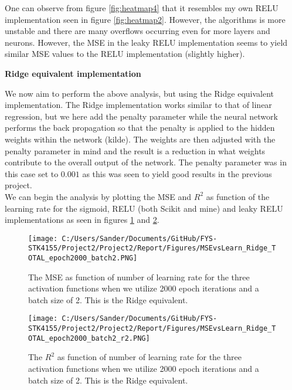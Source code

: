 \documentclass[12pt,a4paper]{article}
\begin{document}
\noindent One can observe from figure \ref{fig:heatmap4} that it resembles my own RELU implementation seen in figure \ref{fig:heatmap2}. However, the algorithms is more unstable and there are many overflows occurring even for more layers and neurons. However, the MSE in the leaky RELU implementation seems to yield similar MSE values to the RELU implementation (slightly higher).

\begin{center}
\large{\textbf{Ridge equivalent implementation}}
\end{center}

\noindent We now aim to perform the above analysis, but using the Ridge equivalent implementation. The Ridge implementation works similar to that of linear regression, but we here add the penalty parameter while the neural network performs the back propagation so that the penalty is applied to the hidden weights within the network (kilde). The weights are then adjusted with the penalty parameter in mind and the result is a reduction in what weights contribute to the overall output of the network. The penalty parameter was in this case set to $0.001$ as this was seen to yield good results in the previous project. 
\\
We can begin the analysis by plotting the MSE and $R^2$ as function of the learning rate for the sigmoid, RELU (both Scikit and mine) and leaky RELU implementations as seen in figures \ref{fig:MSEvsLrateTOTAL8} and \ref{fig:MSEvsLrateTOTAL9}.

\begin{figure}[H]
\centering
\texttt{[image: C:/Users/Sander/Documents/GitHub/FYS-STK4155/Project2/Project2/Report/Figures/MSEvsLearn\_Ridge\_TOTAL\_epoch2000\_batch2.PNG]}
\caption{\label{fig:MSEvsLrateTOTAL8} The MSE as function of number of learning rate for the three activation functions when we utilize 2000 epoch iterations and a batch size of 2. This is the Ridge equivalent.}
\end{figure}

\begin{figure}[H]
\centering
\texttt{[image: C:/Users/Sander/Documents/GitHub/FYS-STK4155/Project2/Project2/Report/Figures/MSEvsLearn\_Ridge\_TOTAL\_epoch2000\_batch2\_r2.PNG]}
\caption{\label{fig:MSEvsLrateTOTAL9} The $R^2$ as function of number of learning rate for the three activation functions when we utilize 2000 epoch iterations and a batch size of 2. This is the Ridge equivalent.}
\end{figure}
\end{document}
